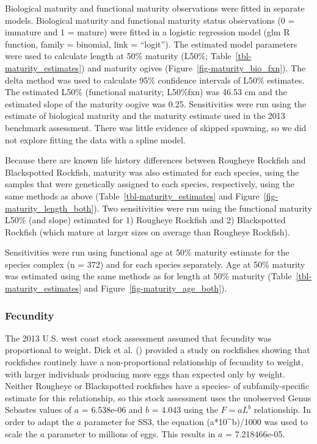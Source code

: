 \documentclass[
]{scrartcl}
\begin{document}
Biological maturity and functional maturity observations were fitted in
separate models. Biological maturity and functional maturity status
observations (0 = immature and 1 = mature) were fitted in a logistic
regression model (glm R function, family = binomial, link = ``logit'').
The estimated model parameters were used to calculate length at 50\%
maturity (L50\%; Table~\ref{tbl-maturity_estimates}) and maturity ogives
(Figure~\ref{fig-maturity_bio_fxn}). The delta method was used to
calculate 95\% confidence intervals of L50\% estimates. The estimated
L50\% (functional maturity; L50\%fxn) was 46.53 cm and the estimated
slope of the maturity oogive was 0.25. Sensitivities were run using the
estimate of biological maturity and the maturity estimate used in the
2013 benchmark assessment. There was little evidence of skipped
spawning, so we did not explore fitting the data with a spline model.

Because there are known life history differences between Rougheye
Rockfish and Blackspotted Rockfish, maturity was also estimated for each
species, using the samples that were genetically assigned to each
species, respectively, using the same methods as above
(Table~\ref{tbl-maturity_estimates} and
Figure~\ref{fig-maturity_length_both}). Two sensitivities were run using
the functional maturity L50\% (and slope) estimated for 1) Rougheye
Rockfish and 2) Blackspotted Rockfish (which mature at larger sizes on
average than Rougheye Rockfish).

Sensitivities were run using functional age at 50\% maturity estimate
for the species complex (n = 372) and for each species separately. Age
at 50\% maturity was estimated using the same methods as for length at
50\% maturity (Table~\ref{tbl-maturity_estimates} and
Figure~\ref{fig-maturity_age_both}).

\subsubsection{Fecundity}\label{fecundity}

The 2013 U.S. west coast stock assessment assumed that fecundity was
proportional to weight. Dick et al.
() provided a study on
rockfishes showing that rockfishes routinely have a non-proportional
relationship of fecundity to weight, with larger individuals producing
more eggs than expected only by weight. Neither Rougheye or Blackspotted
rockfishes have a species- of subfamily-specific estimate for this
relationship, so this stock assessment uses the unobserved Genus
Sebastes values of \(a\) = 6.538e-06 and \(b\) = 4.043 using the
\(F=aL^b\) relationship. In order to adapt the \(a\) parameter for SS3,
the equation (a*10\^{}b)/1000 was used to scale the \(a\) parameter to
millions of eggs. This results in \(a\) = 7.218466e-05.
\end{document}
